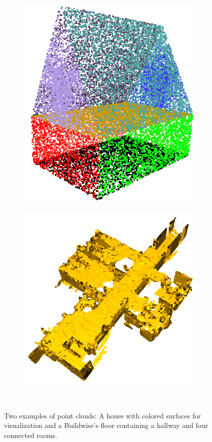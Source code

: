 \begin{figure}[ht]
    \begin{subfigure}{.48\linewidth}
    \centering
    \includegraphics[scale=0.4]{Img/00_Maison.png}
    \end{subfigure}
    \begin{subfigure}{0.48\linewidth}
    \centering
    \includegraphics[scale=0.5]{Img/00_cstc.png}
    \end{subfigure}\\
\caption{Two examples of point clouds: A house with colored surfaces for visualization and a Buildwise's floor containing a hallway and four connected rooms.}
\end{figure}


